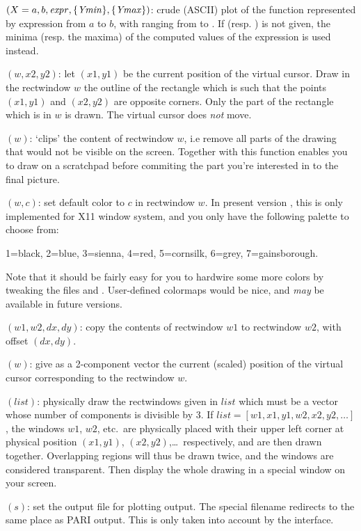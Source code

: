 $(X=a,b,\hbox{\it expr\/},\{\hbox{\it Ymin\/}\},\{\hbox{\it Ymax\/}\})$: crude
(ASCII) plot of the function represented by expression  from
$a$ to $b$, with  ranging from  to . If
 (resp. ) is not given, the minima (resp. the
maxima) of the computed values of the expression is used instead.

$(w,x2,y2)$: let $(x1,y1)$ be the current position of the
virtual cursor. Draw in the rectwindow $w$ the outline of the rectangle which
is such that the points $(x1,y1)$ and $(x2,y2)$ are opposite corners. Only
the part of the rectangle which is in $w$ is drawn. The virtual cursor does
\emph{not} move.

$(w)$: `clips' the content of rectwindow $w$, i.e
remove all parts of the drawing that would not be visible on the screen.
Together with  this function enables you to draw on a
scratchpad before commiting the part you're interested in to the final
picture.

$(w,c)$: set default color to $c$ in rectwindow $w$.
In present version \vers, this is only implemented for X11 window system,
and you only have the following palette to choose from:

1=black, 2=blue, 3=sienna, 4=red, 5=cornsilk, 6=grey, 7=gainsborough.

Note that it should be fairly easy for you to hardwire some more colors by
tweaking the files  and . User-defined
colormaps would be nice, and \emph{may} be available in future versions.

$(w1,w2,dx,dy)$: copy the contents of rectwindow
$w1$ to rectwindow $w2$, with offset $(dx,dy)$.

$(w)$: give as a 2-component vector the current
(scaled) position of the virtual cursor corresponding to the rectwindow $w$.

$(list)$: physically draw the rectwindows given in $list$
which must be a vector whose number of components is divisible by 3. If
$list=[w1,x1,y1,w2,x2,y2,\dots]$, the windows $w1$, $w2$, etc.~are
physically placed with their upper left corner at physical position
$(x1,y1)$, $(x2,y2)$,\dots\ respectively, and are then drawn together.
Overlapping regions will thus be drawn twice, and the windows are considered
transparent. Then display the whole drawing in a special window on your
screen.

$(s)$: set the output file for plotting output. The
special filename  redirects to the same place as PARI output. This
is only taken into account by the  interface.

